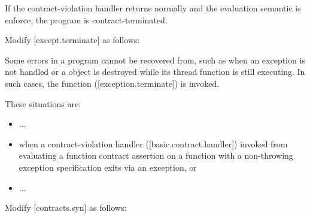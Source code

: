\begin{adjustwidth}{0.5cm}{0.5cm}


If the contract-violation handler returns normally and the evaluation semantic is enforce,
the program is contract-terminated.

\end{adjustwidth}

Modify [except.terminate] as follows:

\begin{adjustwidth}{0.5cm}{0.5cm}
Some errors in a program cannot be recovered from, such as when an exception is not
handled or a  object is destroyed while its thread function is still executing.
In such cases, the function  ([exception.terminate]) is invoked. 
\begin{note}
These situations are:
\begin{itemize}
\item ...
\item when  a contract-violation handler ([basic.contract.handler]) invoked from evaluating a function contract assertion on a function with a non-throwing exception specification exits via an exception, or
\item ...
\end{itemize}
\end{note}
\end{adjustwidth}

Modify [contracts.syn] as follows:

